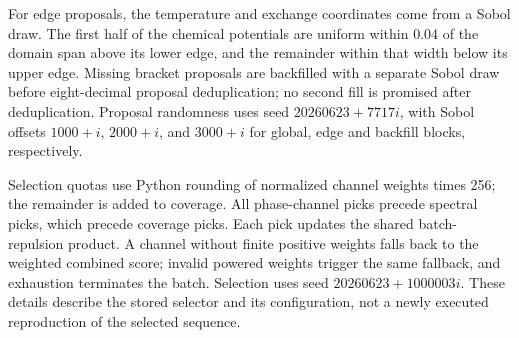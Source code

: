 For edge proposals, the temperature and exchange coordinates come from a Sobol draw. The first half of the chemical potentials are uniform within 0.04 of the domain span above its lower edge, and the remainder within that width below its upper edge. Missing bracket proposals are backfilled with a separate Sobol draw before eight-decimal proposal deduplication; no second fill is promised after deduplication. Proposal randomness uses seed $20260623+7717i$, with Sobol offsets $1000+i$, $2000+i$, and $3000+i$ for global, edge and backfill blocks, respectively.

Selection quotas use Python rounding of normalized channel weights times 256; the remainder is added to coverage. All phase-channel picks precede spectral picks, which precede coverage picks. Each pick updates the shared batch-repulsion product. A channel without finite positive weights falls back to the weighted combined score; invalid powered weights trigger the same fallback, and exhaustion terminates the batch. Selection uses seed $20260623+1000003i$. These details describe the stored selector and its configuration, not a newly executed reproduction of the selected sequence.
